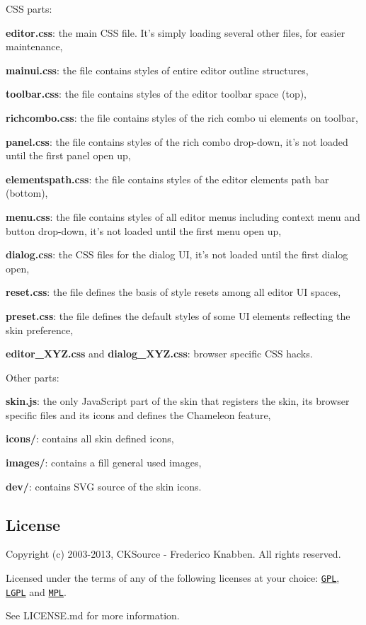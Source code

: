 C\-S\-S parts\-:
\begin{DoxyItemize}
\item {\bfseries editor.\-css}\-: the main C\-S\-S file. It's simply loading several other files, for easier maintenance,
\item {\bfseries mainui.\-css}\-: the file contains styles of entire editor outline structures,
\item {\bfseries toolbar.\-css}\-: the file contains styles of the editor toolbar space (top),
\item {\bfseries richcombo.\-css}\-: the file contains styles of the rich combo ui elements on toolbar,
\item {\bfseries panel.\-css}\-: the file contains styles of the rich combo drop-\/down, it's not loaded until the first panel open up,
\item {\bfseries elementspath.\-css}\-: the file contains styles of the editor elements path bar (bottom),
\item {\bfseries menu.\-css}\-: the file contains styles of all editor menus including context menu and button drop-\/down, it's not loaded until the first menu open up,
\item {\bfseries dialog.\-css}\-: the C\-S\-S files for the dialog U\-I, it's not loaded until the first dialog open,
\item {\bfseries reset.\-css}\-: the file defines the basis of style resets among all editor U\-I spaces,
\item {\bfseries preset.\-css}\-: the file defines the default styles of some U\-I elements reflecting the skin preference,
\item {\bfseries editor\-\_\-\-X\-Y\-Z.\-css} and {\bfseries dialog\-\_\-\-X\-Y\-Z.\-css}\-: browser specific C\-S\-S hacks.
\end{DoxyItemize}

Other parts\-:
\begin{DoxyItemize}
\item {\bfseries skin.\-js}\-: the only Java\-Script part of the skin that registers the skin, its browser specific files and its icons and defines the Chameleon feature,
\item {\bfseries icons/}\-: contains all skin defined icons,
\item {\bfseries images/}\-: contains a fill general used images,
\item {\bfseries dev/}\-: contains S\-V\-G source of the skin icons.
\end{DoxyItemize}

\subsection*{License }

Copyright (c) 2003-\/2013, C\-K\-Source -\/ Frederico Knabben. All rights reserved.

Licensed under the terms of any of the following licenses at your choice\-: \href{http://www.gnu.org/licenses/gpl.html}{\tt G\-P\-L}, \href{http://www.gnu.org/licenses/lgpl.html}{\tt L\-G\-P\-L} and \href{http://www.mozilla.org/MPL/MPL-1.1.html}{\tt M\-P\-L}.

See L\-I\-C\-E\-N\-S\-E.\-md for more information. 